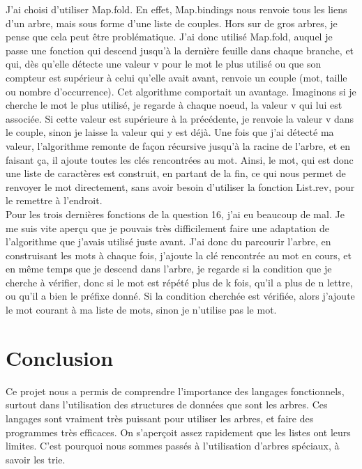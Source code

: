 \documentclass[a4paper, title page, 12pt]{report}
\begin{document}
	J'ai choisi d'utiliser Map.fold. En effet, Map.bindings nous renvoie tous les liens d'un arbre, mais sous forme d'une liste de couples. Hors sur de gros arbres, je pense que cela peut être problématique. J'ai donc utilisé Map.fold, auquel je passe une fonction qui descend jusqu'à la dernière feuille dans chaque branche, et qui, dès qu'elle détecte une valeur v pour le mot le plus utilisé ou que son compteur est supérieur à celui qu'elle avait avant, renvoie un couple (mot, taille ou nombre d'occurrence). Cet algorithme comportait un avantage. Imaginons si je cherche le mot le plus utilisé, je regarde à chaque noeud, la valeur v qui lui est associée. Si cette valeur est supérieure à la précédente, je renvoie la valeur v dans le couple, sinon je laisse la valeur qui y est déjà. Une fois que j'ai détecté ma valeur, l'algorithme remonte de façon récursive jusqu'à la racine de l'arbre, et en faisant ça, il ajoute toutes les clés rencontrées au mot. Ainsi, le mot, qui est donc une liste de caractères est construit, en partant de la fin, ce qui nous permet de renvoyer le mot directement, sans avoir besoin d'utiliser la fonction List.rev, pour le remettre à l'endroit.\\
	
	Pour les trois dernières fonctions de la question 16, j'ai eu beaucoup de mal. Je me suis vite aperçu que je pouvais très difficilement faire une adaptation de l'algorithme que j'avais utilisé juste avant. J'ai donc du parcourir l'arbre, en construisant les mots à chaque fois, j'ajoute la clé rencontrée au mot en cours, et en même temps que je descend dans l'arbre, je regarde si la condition que je cherche à vérifier, donc si le mot est répété plus de k fois, qu'il a plus de n lettre, ou qu'il a bien le préfixe donné. Si la condition cherchée est vérifiée, alors j'ajoute le mot courant à ma liste de mots, sinon je n'utilise pas le mot.
	\section*{Conclusion}
	Ce projet nous a permis de comprendre l'importance des langages fonctionnels, surtout dans l'utilisation des structures de données que sont les arbres. Ces langages sont vraiment très puissant pour utiliser les arbres, et faire des programmes très efficaces. On s'aperçoit assez rapidement que les listes ont leurs limites. C'est pourquoi nous sommes passés à l'utilisation d'arbres spéciaux, à savoir les trie.
\end{document}
